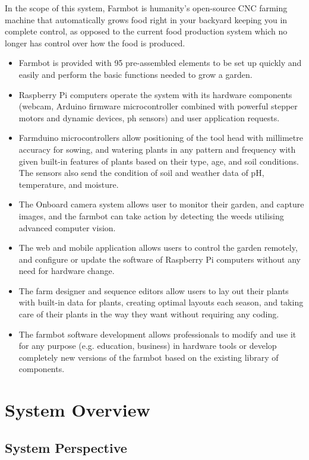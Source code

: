 In the scope of this system, Farmbot is humanity's open-source CNC farming machine that automatically grows food right in your backyard keeping you in complete control, as opposed to the current food production system which no longer has control over how the food is produced. 
\begin{itemize}
    \item Farmbot is provided with 95 pre-assembled elements to be set up quickly and easily and perform the basic functions needed to grow a garden.
    \item Raspberry Pi computers operate the system with its hardware components (webcam, Arduino firmware microcontroller combined with powerful stepper motors and dynamic devices, ph sensors) and user application requests.
    \item Farmduino microcontrollers allow positioning of the tool head with millimetre accuracy for sowing, and watering plants in any pattern and frequency with given built-in features of plants based on their type, age, and soil conditions. The sensors also send the condition of soil and weather data of pH, temperature, and moisture.
    \item The Onboard camera system allows user to monitor their garden, and capture images, and the farmbot can take action by detecting the weeds utilising advanced computer vision.
    \item The web and mobile application allows users to control the garden remotely, and configure or update the software of Raspberry Pi computers without any need for hardware change.
    \item The farm designer and sequence editors allow users to lay out their plants with built-in data for plants, creating optimal layouts each season, and taking care of their plants in the way they want without requiring any coding.
    \item The farmbot software development allows professionals to modify and use it for any purpose (e.g. education, business) in hardware tools or develop completely new versions of the farmbot based on the existing library of components.
    
\end{itemize}

\section{System Overview}


\subsection{System Perspective}

